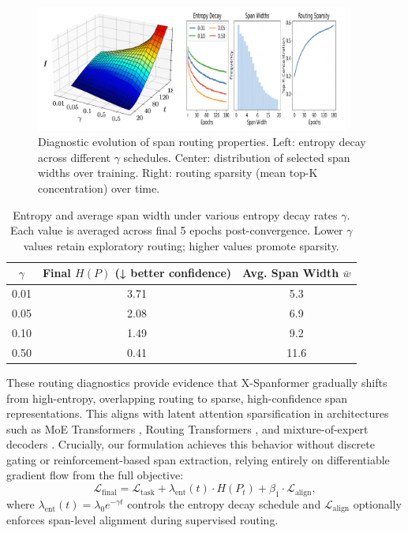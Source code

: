 \begin{figure}[H]
  \centering
  \includegraphics[width=0.92\textwidth]{figures/figure_6.png}
  \caption{Diagnostic evolution of span routing properties. Left: entropy decay across different \(\gamma\) schedules. Center: distribution of selected span widths over training. Right: routing sparsity (mean top-K concentration) over time.}
  \label{fig:span_stats}
\end{figure}

\begin{table}[H]
\centering
\caption{Entropy and average span width under various entropy decay rates \(\gamma\). Each value is averaged across final 5 epochs post-convergence. Lower \(\gamma\) values retain exploratory routing; higher values promote sparsity.}
\label{tab:entropy_sweep}
\begin{tabular}{c|c|c}
\toprule
\(\gamma\) & Final \(H(P)\) (↓ better confidence) & Avg. Span Width \(\bar{w}\) \\
\midrule
0.01 & 3.71 & 5.3 \\
0.05 & 2.08 & 6.9 \\
0.10 & 1.49 & 9.2 \\
0.50 & 0.41 & 11.6 \\
\bottomrule
\end{tabular}
\end{table}

\vspace{0.5em}
\noindent These routing diagnostics provide evidence that X-Spanformer gradually shifts from high-entropy, overlapping routing to sparse, high-confidence span representations. This aligns with latent attention sparsification in architectures such as MoE Transformers \cite{shazeer2017outrageously}, Routing Transformers \cite{tay2020sparse}, and mixture-of-expert decoders \cite{gupta2022molt}. Crucially, our formulation achieves this behavior without discrete gating or reinforcement-based span extraction, relying entirely on differentiable gradient flow from the full objective:
\[
\mathcal{L}_{\text{final}} = \mathcal{L}_{\text{task}} + \lambda_{\mathrm{ent}}(t) \cdot H(P_t) + \beta_1 \cdot \mathcal{L}_{\text{align}},
\]
where \(\lambda_{\mathrm{ent}}(t) = \lambda_0 e^{-\gamma t}\) controls the entropy decay schedule and \(\mathcal{L}_{\text{align}}\) optionally enforces span-level alignment during supervised routing.

